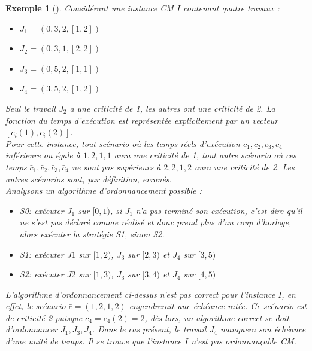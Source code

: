 \documentclass[12pt,a4paper,oneside]{book}
\theoremstyle{break}
\newtheorem{exem}{Exemple}[chapter]
\theoremstyle{breakplain}
\begin{document}
\begin{exem}[\cite{baruah2010towards}]
Considérant une instance CM $I$ contenant quatre travaux :
\begin{itemize}
\item $J_1 = (0,3,2,[1,2])$
\item $J_2 = (0,3,1,[2,2])$
\item $J_3 = (0,5,2,[1,1])$
\item $J_4 = (3,5,2,[1,2])$\\
\end{itemize}

Seul le travail $J_2$ a une criticité de 1, les autres ont une criticité de 2. La fonction du temps d'exécution est représentée explicitement par un vecteur $[c_i(1), c_i(2)]$.\\
Pour cette instance, tout scénario où les temps réels d'exécution $\bar{c}_1,\bar{c}_2,\bar{c}_3,\bar{c}_4$ inférieure ou égale à $1,2,1,1$ aura une criticité de 1, tout autre scénario où ces temps $\bar{c}_1,\bar{c}_2,\bar{c}_3,\bar{c}_4$ ne sont pas supérieurs à $ 2,2,1,2$ aura une criticité de 2. Les autres scénarios sont, par définition, erronés.\\

Analysons un algorithme d'ordonnancement possible :
\begin{itemize}
\item S0: exécuter $J_1$ sur $[0,1)$, si $J_1$ n'a pas terminé son exécution, c'est dire qu'il ne s'est pas déclaré comme réalisé et donc prend plus d’un coup d'horloge, alors exécuter la stratégie S1, sinon S2.
\item S1: exécuter $J1$ sur $[1,2)$, $J_3$ sur $[2,3)$ et $J_4$ sur $[3,5)$
\item S2: exécuter $J2$ sur $[1,3)$, $J_3$ sur $[3,4)$ et $J_4$ sur $[4,5)$\\
\end{itemize}

L'algorithme d'ordonnancement ci-dessus n'est pas correct pour l'instance $I$, en effet, le scénario $\bar{c} = (1,2,1,2)$ engendrerait une échéance ratée. Ce scénario est de criticité 2 puisque $\bar{c}_4 = c_4(2) = 2$, dès lors, un algorithme correct se doit d'ordonnancer $J_1, J_3, J_4$. Dans le cas présent, le travail $J_4$ manquera son échéance d'une unité de temps. Il se trouve que l'instance $I$ n'est pas ordonnançable CM.
\end{exem}
\end{document}
